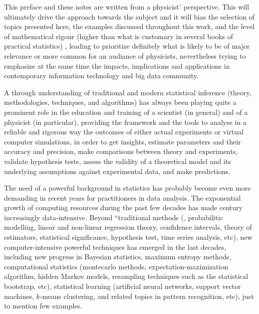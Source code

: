


This preface and these notes are written from a physicist' perspective. 
This will ultimately drive the approach towards the subject and it will bias the selection of topics
presented here,
the examples discussed throughout this work, and the
level of mathematical rigour (higher than what is customary in several books of practical statistics) ,
leading to prioritize definitely what is likely to be of major relevance or more common for an
audiance of physicists, nevertheless trying to emphasize at the same time the impacts, implications 
and applications 
in contemporary information technology and big data community.

A through understanding of traditional and modern 
statistical inference (theory, methodologies, techniques, and algorithms) 
has always been playing quite a prominent  
role in the education and training of a scientist (in general) and of a
physicist (in particular), providing the framework and the tools to analyse
in a reliable and rigorous way 
the outcomes of
either actual experiments 
or virtual computer simulations,
in order to get insights, estimate parameters and their accuracy and precision, make comparisons between theory and
experiments, validate 
hypothesis tests, assess the validity of a theoretical model and its underlying
assumptions against experimental data, and make predictions. 

The need of a powerful background in statistics has probably become even more
demanding in recent years for practitioners in data analysis. 
The exponential growth of computing resources during the past few decades has made
 century increasingly data-intensive.
Beyond ``traditional methods (\eg, probabilitic modelling, linear and non-linear  regression theory,
confidence intervals, theory of estimators,  statistical significance,
hypothesis test, time series analysis, etc), new computer-intensive powerful
techniques has emerged in the last decades, including new progress in
Bayesian statistics, maximum entropy methods, computational statistics
(montecarlo methods, expectation-maximization algorithm,
hidden Markov models, resampling techniques such as the statistical bootstrap, etc), statistical learning 
(artificial neural
networks, support vector machines, $k$-means clustering, and
related topics in pattern recognition, etc), just
to mention few examples. 



